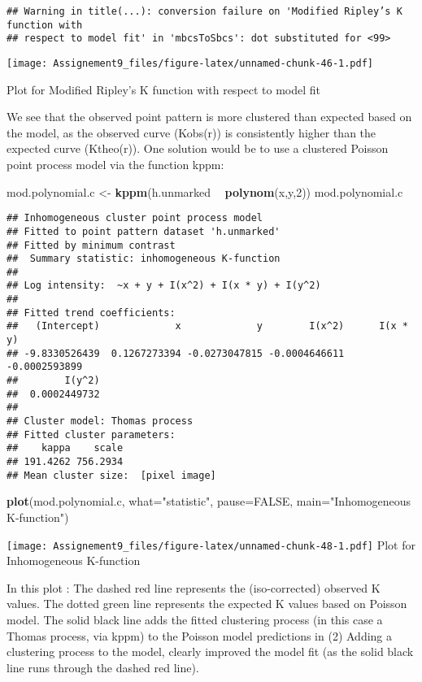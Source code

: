 \documentclass[]{article}
\newenvironment{Shaded}{\begin{snugshade}}{\end{snugshade}}
\newcommand{\DataTypeTok}[1]{\textcolor[rgb]{0.13,0.29,0.53}{#1}}
\newcommand{\DecValTok}[1]{\textcolor[rgb]{0.00,0.00,0.81}{#1}}
\newcommand{\KeywordTok}[1]{\textcolor[rgb]{0.13,0.29,0.53}{\textbf{#1}}}
\newcommand{\NormalTok}[1]{#1}
\newcommand{\OperatorTok}[1]{\textcolor[rgb]{0.81,0.36,0.00}{\textbf{#1}}}
\newcommand{\OtherTok}[1]{\textcolor[rgb]{0.56,0.35,0.01}{#1}}
\newcommand{\StringTok}[1]{\textcolor[rgb]{0.31,0.60,0.02}{#1}}
\begin{document}
\begin{verbatim}
## Warning in title(...): conversion failure on 'Modified Ripley’s K function with
## respect to model fit' in 'mbcsToSbcs': dot substituted for <99>
\end{verbatim}

\texttt{[image: Assignement9\_files/figure-latex/unnamed-chunk-46-1.pdf]}

Plot for Modified Ripley's K function with respect to model fit

We see that the observed point pattern is more clustered than expected
based on the model, as the observed curve (Kobs(r)) is consistently
higher than the expected curve (Ktheo(r)). One solution would be to use
a clustered Poisson point process model via the function kppm:

\begin{Shaded}
\begin{Highlighting}[]
\NormalTok{mod.polynomial.c <-}\StringTok{ }\KeywordTok{kppm}\NormalTok{(h.unmarked }\OperatorTok{~}\StringTok{ }\KeywordTok{polynom}\NormalTok{(x,y,}\DecValTok{2}\NormalTok{))}
\NormalTok{mod.polynomial.c}
\end{Highlighting}
\end{Shaded}

\begin{verbatim}
## Inhomogeneous cluster point process model
## Fitted to point pattern dataset 'h.unmarked'
## Fitted by minimum contrast
##  Summary statistic: inhomogeneous K-function
## 
## Log intensity:  ~x + y + I(x^2) + I(x * y) + I(y^2)
## 
## Fitted trend coefficients:
##   (Intercept)             x             y        I(x^2)      I(x * y) 
## -9.8330526439  0.1267273394 -0.0273047815 -0.0004646611 -0.0002593899 
##        I(y^2) 
##  0.0002449732 
## 
## Cluster model: Thomas process
## Fitted cluster parameters:
##    kappa    scale 
## 191.4262 756.2934 
## Mean cluster size:  [pixel image]
\end{verbatim}

\begin{Shaded}
\begin{Highlighting}[]
\KeywordTok{plot}\NormalTok{(mod.polynomial.c, }\DataTypeTok{what=}\StringTok{"statistic"}\NormalTok{, }\DataTypeTok{pause=}\OtherTok{FALSE}\NormalTok{, }\DataTypeTok{main=}\StringTok{"Inhomogeneous K-function"}\NormalTok{)}
\end{Highlighting}
\end{Shaded}

\texttt{[image: Assignement9\_files/figure-latex/unnamed-chunk-48-1.pdf]}
Plot for Inhomogeneous K-function

In this plot : The dashed red line represents the (iso-corrected)
observed K values. The dotted green line represents the expected K
values based on Poisson model. The solid black line adds the fitted
clustering process (in this case a Thomas process, via kppm) to the
Poisson model predictions in (2) Adding a clustering process to the
model, clearly improved the model fit (as the solid black line runs
through the dashed red line).
\end{document}
